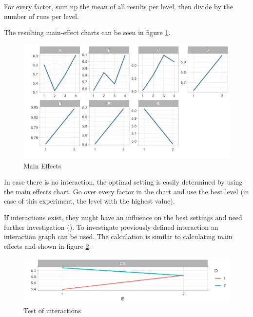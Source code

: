 For every factor, sum up the mean of all results per level, then divide by the number of runs per level.


The resulting main-effect charts can be seen in figure \ref{figure:taguchi:main_effects}.
\begin{figure}[ht] 
	\label{figure:taguchi:main_effects}
	\includegraphics[width=1\linewidth]{simulations/taguchi/plots/main_effects}
	\caption{Main Effects}
\end{figure}


In case there is no interaction, the optimal setting is easily determined by using the main effects chart. Go over every factor in the chart and use the best level (in case of this experiment, the level with the highest value). 

If interactions exist, they might have an influence on the best settings and need further investigation (\cite{yang_design_2009}). To investigate previously defined interaction an interaction graph can be used. The calculation is similar to calculating main effects and shown in figure \ref{figure:taguchi:test_of_interaction}.


\begin{figure}[ht] 
	\label{figure:taguchi:test_of_interaction}
	\includegraphics[width=1\linewidth]{simulations/taguchi/plots/test_of_interaction}
	\caption{Test of interactions}
\end{figure}

